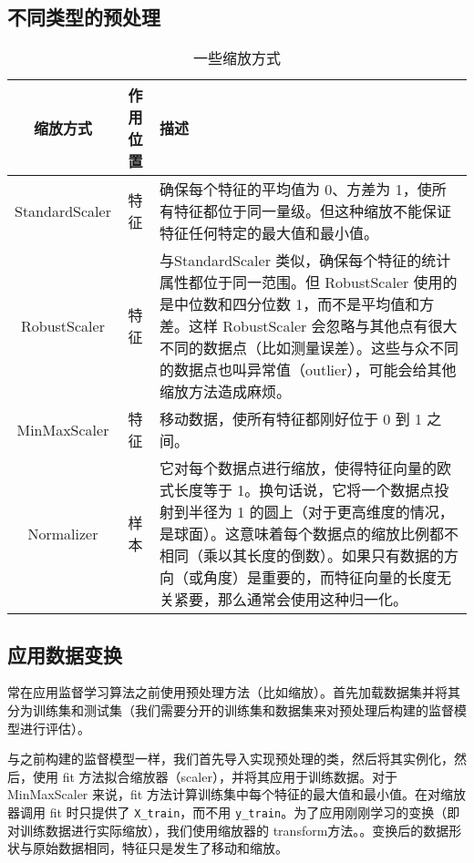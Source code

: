 \subsection{不同类型的预处理}
\begin{table}[H]
    \centering
    \caption{一些缩放方式}
    \begin{tabularx}{\textwidth}{ccX}
        \hline
        缩放方式           & 作用位置 & 描述                                                                                                                                                              \\
        \hline
        StandardScaler & 特征   & 确保每个特征的平均值为 0、方差为 1，使所有特征都位于同一量级。但这种缩放不能保证特征任何特定的最大值和最小值。                                                                                                       \\
        RobustScaler   & 特征   & 与StandardScaler 类似，确保每个特征的统计属性都位于同一范围。但 RobustScaler 使用的是中位数和四分位数 1，而不是平均值和方差。这样 RobustScaler 会忽略与其他点有很大不同的数据点（比如测量误差）。这些与众不同的数据点也叫异常值（outlier），可能会给其他缩放方法造成麻烦。 \\
        MinMaxScaler   & 特征   & 移动数据，使所有特征都刚好位于 0 到 1 之间。                                                                                                                                       \\
        Normalizer     & 样本   & 它对每个数据点进行缩放，使得特征向量的欧式长度等于 1。换句话说，它将一个数据点投射到半径为 1 的圆上（对于更高维度的情况，是球面）。这意味着每个数据点的缩放比例都不相同（乘以其长度的倒数）。如果只有数据的方向（或角度）是重要的，而特征向量的长度无关紧要，那么通常会使用这种归一化。                  \\
        \hline
    \end{tabularx}
\end{table}
\subsection{应用数据变换}
常在应用监督学习算法之前使用预处理方法（比如缩放）。首先加载数据集并将其分为训练集和测试集（我们需要分开的训练集和数据集来对预处理后构建的监督模型进行评估）。

与之前构建的监督模型一样，我们首先导入实现预处理的类，然后将其实例化，然后，使用 fit 方法拟合缩放器（scaler），并将其应用于训练数据。对于 MinMaxScaler 来说，fit 方法计算训练集中每个特征的最大值和最小值。在对缩放器调用 fit 时只提供了 \verb|X_train|，而不用 \verb|y_train|。为了应用刚刚学习的变换（即对训练数据进行实际缩放），我们使用缩放器的 transform方法。。变换后的数据形状与原始数据相同，特征只是发生了移动和缩放。

